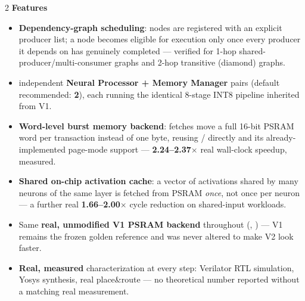 \vspace{8pt}
\begin{multicols}{2}
{\color{fnDark}\large\bfseries Features}\\[2pt]
{\footnotesize
\begin{itemize}[leftmargin=1.1em]
\item \textbf{Dependency-graph scheduling}: nodes are registered with an
      explicit producer list; a node becomes eligible for execution only
      once every producer it depends on has genuinely completed --- verified
      for 1-hop shared-producer/multi-consumer graphs and 2-hop transitive
      (diamond) graphs.
\item {} independent \textbf{Neural Processor + Memory Manager}
      pairs (default recommended: \textbf{2}), each running the identical
      8-stage INT8 pipeline inherited from V1.
\item \textbf{Word-level burst memory backend}: fetches move a full 16-bit
      PSRAM word per transaction instead of one byte, reusing
      / directly and its
      already-implemented page-mode support --- \textbf{2.24--2.37$\times$}
      real wall-clock speedup, measured.
\item \textbf{Shared on-chip activation cache}: a vector of activations
      shared by many neurons of the same layer is fetched from PSRAM
      \emph{once}, not once per neuron --- a further real
      \textbf{1.66--2.00$\times$} cycle reduction on shared-input workloads.
\item Same \textbf{real, unmodified V1 PSRAM backend} throughout
      (, ) --- V1 remains
      the frozen golden reference and was never altered to make V2 look
      faster.
\item \textbf{Real, measured} characterization at every step: Verilator
      RTL simulation, Yosys synthesis, real 
      place\&route --- no theoretical number reported without a matching
      real measurement.
\end{itemize}}

\columnbreak


\end{multicols}
